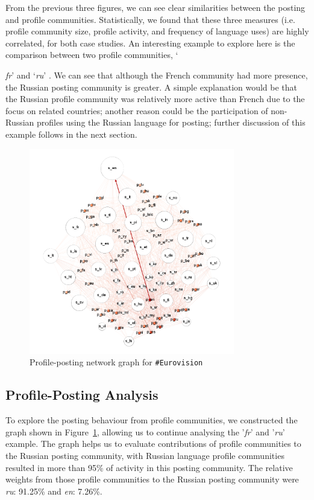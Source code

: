 \documentclass{llncs}
\begin{document}
From the previous three figures, we can see clear similarities between
the posting and profile communities. Statistically, we found that
these three measures (i.e. profile community size, profile activity,
and frequency of language uses) are highly correlated, for both case
studies. An interesting example to explore here is the comparison
between two profile communities, `{\emph{fr}' and `{\emph{ru}}' .  We
can see that although the French community had more presence, the
Russian posting community is greater. A simple explanation would be
that the Russian profile community was relatively more active than
French due to the focus on related countries; another reason could be
the participation of non-Russian profiles using the Russian language
for posting; further discussion of this example follows in the next
section.

\begin{figure}[!htb]
\centering
\includegraphics[width=0.8\textwidth]{images/euro_pslang.png}
\caption{Profile-posting network graph for {\texttt{\#Eurovision}}}
\label{fig:eurovisionpslang}
\end{figure}

\subsection{Profile-Posting Analysis}\label{eurovisionppanalysis}

To explore the posting behaviour from profile communities, we
constructed the graph shown in Figure~\ref{fig:eurovisionpslang},
allowing us to continue analysing the '{\emph{fr}}' and '{\emph{ru}}'
example.  The graph helps us to evaluate contributions of profile
communities to the Russian posting community, with Russian language
profile communities resulted in more than 95\% of activity in this
posting community. The relative weights from those profile communities
to the Russian posting community were {\emph{ru}}: 91.25\% and
{\emph{en}}: 7.26\%.

}
\end{document}
